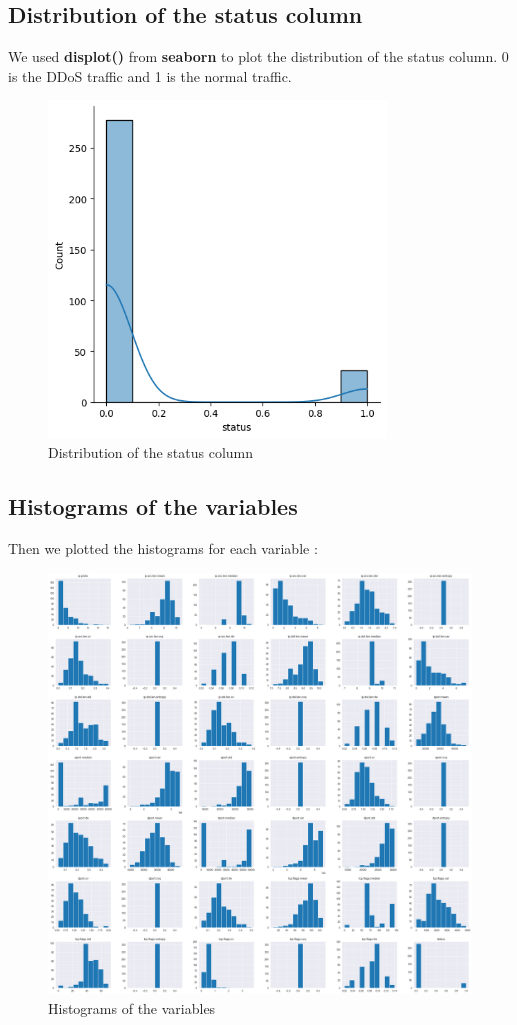 \subsection{Distribution of the status column}
 We used \textbf{displot()} from \textbf{seaborn} to plot the distribution of the status column. 0 is the DDoS traffic and 1 is the normal traffic.
\begin{figure}[h]
	\centering
	\includegraphics[width=0.8\textwidth]{./assets/images/distribution.png}
	\caption{Distribution of the status column}
\end{figure}

\pagebreak \subsection{Histograms of the variables}
Then we plotted the histograms for each variable :
\begin{figure}[h]
	\centering
	\includegraphics[width=1\textwidth]{./assets/images/hist.png}
	\caption{Histograms of the variables}
\end{figure} 

